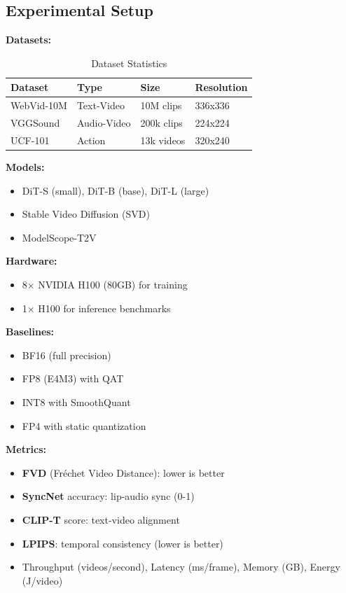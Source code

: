 \documentclass[journal,twoside]{IEEEtran}
\theoremstyle{definition}
\theoremstyle{remark}
\begin{document}
\FloatBarrier
\subsection{Experimental Setup}

\textbf{Datasets:}

\begin{table}[H]
\centering
\caption{Dataset Statistics}
\label{tab:datasets}
\begin{tabular}{llll}
\toprule
Dataset & Type & Size & Resolution \\
\midrule
WebVid-10M & Text-Video & 10M clips & 336x336 \\
VGGSound & Audio-Video & 200k clips & 224x224 \\
UCF-101 & Action & 13k videos & 320x240 \\
\bottomrule
\end{tabular}
\end{table}

\textbf{Models:}
\begin{itemize}
    \item DiT-S (small), DiT-B (base), DiT-L (large) \cite{peebles2023scalable}
    \item Stable Video Diffusion (SVD) \cite{stability2023svd}
    \item ModelScope-T2V \cite{wang2023modelscope}
\end{itemize}

\textbf{Hardware:}
\begin{itemize}
    \item 8$\times$ NVIDIA H100 (80GB) for training
    \item 1$\times$ H100 for inference benchmarks
\end{itemize}

\textbf{Baselines:}
\begin{itemize}
    \item BF16 (full precision)
    \item FP8 (E4M3) with QAT \cite{nvidia2022fp8}
    \item INT8 with SmoothQuant \cite{xiao2023smoothquant}
    \item FP4 with static quantization
\end{itemize}

\textbf{Metrics:}
\begin{itemize}
    \item \textbf{FVD} (Fréchet Video Distance): lower is better
    \item \textbf{SyncNet} accuracy: lip-audio sync (0-1)
    \item \textbf{CLIP-T} score: text-video alignment
    \item \textbf{LPIPS}: temporal consistency (lower is better)
    \item Throughput (videos/second), Latency (ms/frame), Memory (GB), Energy (J/video)
\end{itemize}
\end{document}
